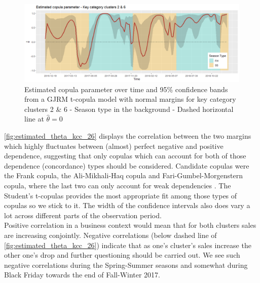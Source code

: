 \begin{figure}[H]
\centering
  \includegraphics[width=0.95\linewidth]{figures/estimated_theta_kcc_26.png}
  \caption{Estimated copula parameter over time and 95\% confidence bands from a \ac{GJRM} t-copula model with normal margins for key category clusters 2 \& 6 - Season type in the background - Dashed horizontal line at $\hat{\theta} = 0$}
  \label{fig:estimated_theta_kcc_26}
\end{figure}

\autoref{fig:estimated_theta_kcc_26} displays the correlation between the two margins which highly fluctuates between (almost) perfect negative and positive dependence, suggesting that only copulas which can account for both of those dependence (concordance) types should be considered. Candidate copulas were the Frank copula, the Ali-Mikhali-Haq copula and Fari-Gumbel-Morgenstern copula, where the last two can only account for weak dependencies \citep{marra1605bivariate}. The Student's t-copulas provides the most appropriate fit among those types of copulas so we stick to it. The width of the confidence intervals also does vary a lot across different parts of the observation period. \\

Positive correlation in a business context would mean that for both clusters sales are increasing conjointly. Negative correlations (below dashed line of \autoref{fig:estimated_theta_kcc_26}) indicate that as one's cluster's sales increase the other one's drop and further questioning should be carried out. We see such negative correlations during the Spring-Summer seasons and somewhat during Black Friday towards the end of Fall-Winter 2017.


